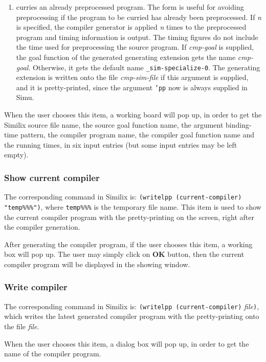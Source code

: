 \begin{sloppypar}
\begin{enumerate}
\item curries an already preprocessed program. The form is useful for
   avoiding preprocessing if the program to be curried has already
   been preprocessed. If {\it n} is specified, the compiler generator
   is applied {\it n} times to the preprocessed program and timing
   information is output.  The timing figures do not include the time
   used for preprocessing the source program. If {\it cmp-goal} is
   supplied, the goal function of the generated generating extension
   gets the name {\it cmp-goal}. Otherwise, it gets the default name
   {\tt \_sim-specialize-0}. The generating extension is written onto
   the file {\it cmp-sim-file} if this argument is supplied, and it is
   pretty-printed, since the argument {\tt 'pp} now is always supplied
   in Simu.
\end{enumerate}
\medskip
\par
   When the user chooses this item, a working board will pop up, in
order to get the Similix source file name, the source goal function
name, the argument binding-time pattern, the compiler program name,
the compiler goal function name and the running times, in six input
entries (but some input entries may be left empty).


\subsubsection{Show current compiler}


The corresponding command in Similix is: {\tt (writelpp
(current-compiler) "temp\%\%\%")}, where {\tt temp\%\%\%} is the
temporary file name.  This item is used to show the current compiler
program with the pretty-printing on the screen, right after the
compiler generation.

   After generating the compiler program, if the user chooses this
item, a working box will pop up. The user may simply click on {\bf OK}
button, then the current compiler program will be displayed in the
showing window.


\subsubsection{Write compiler}


The corresponding command in Similix is: {\tt (writelpp
(current-compiler)} {\it file}{\tt )}, which writes the latest
generated compiler program with the pretty-printing onto the file {\it
file}.

   When the user chooses this item, a dialog box will pop up, in order
to get the name of the compiler program.



\end{sloppypar}

